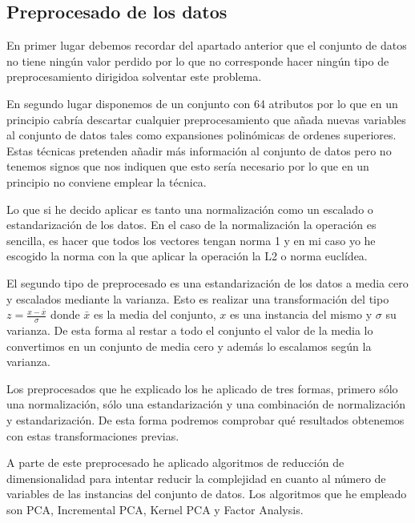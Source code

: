 \documentclass[12pt,a4paper]{article}
\begin{document}
\subsection{Preprocesado de los datos}

En primer lugar debemos recordar del apartado anterior que el conjunto de datos no tiene ningún valor perdido por lo que no corresponde hacer ningún tipo de preprocesamiento dirigidoa solventar este problema.

En segundo lugar disponemos de un conjunto con 64 atributos por lo que en un principio cabría descartar cualquier preprocesamiento que añada nuevas variables al conjunto de datos tales como expansiones polinómicas de ordenes superiores. Estas técnicas pretenden añadir más información al conjunto de datos pero no tenemos signos que nos indiquen que esto sería necesario por lo que en un principio no conviene emplear la técnica. 

Lo que si he decido aplicar es tanto una normalización como un escalado o estandarización de los datos. En el caso de la normalización la operación es sencilla, es hacer que todos los vectores tengan norma 1 y en mi caso yo he escogido la norma con la que aplicar la operación la L2 o norma euclídea. 

El segundo tipo de preprocesado es una estandarización de los datos a media cero y escalados mediante la varianza. Esto es realizar una transformación del tipo $z = \frac{x-\bar{x}}{\sigma}$ donde $\bar{x}$ es la media del conjunto, $x$ es una instancia del mismo y $\sigma$ su varianza. De esta forma al restar a todo el conjunto el valor de la media lo convertimos en un conjunto de media cero y además lo escalamos según la varianza.

Los preprocesados que he explicado los he aplicado de tres formas, primero sólo una normalización, sólo una estandarización y una combinación de normalización y estandarización. De esta forma podremos comprobar qué resultados obtenemos con estas transformaciones previas.

A parte de este preprocesado he aplicado algoritmos de reducción de dimensionalidad para intentar reducir la complejidad en cuanto al número de variables de las instancias del conjunto de datos. Los algoritmos que he empleado son PCA, Incremental PCA, Kernel PCA y Factor Analysis. 
\end{document}
